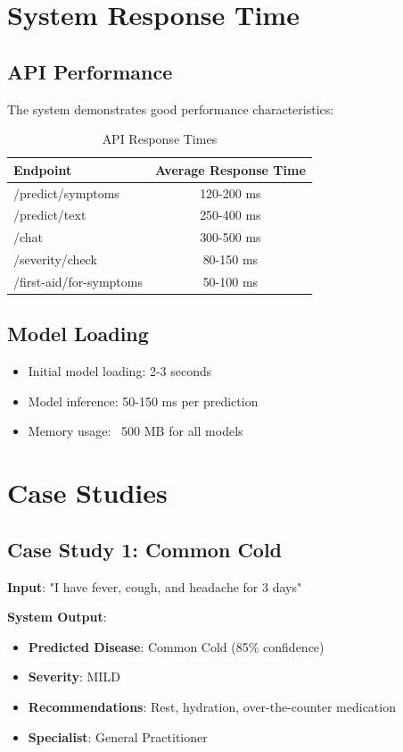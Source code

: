 \section{System Response Time}
\subsection{API Performance}
The system demonstrates good performance characteristics:

\begin{table}[H]
\centering
\caption{API Response Times}
\begin{tabular}{|l|c|}
\hline
\textbf{Endpoint} & \textbf{Average Response Time} \\
\hline
/predict/symptoms & 120-200 ms \\
\hline
/predict/text & 250-400 ms \\
\hline
/chat & 300-500 ms \\
\hline
/severity/check & 80-150 ms \\
\hline
/first-aid/for-symptoms & 50-100 ms \\
\hline
\end{tabular}
\end{table}

\subsection{Model Loading}
\begin{itemize}
    \item Initial model loading: 2-3 seconds
    \item Model inference: 50-150 ms per prediction
    \item Memory usage: ~500 MB for all models
\end{itemize}

\section{Case Studies}
\subsection{Case Study 1: Common Cold}
\textbf{Input}: "I have fever, cough, and headache for 3 days"

\textbf{System Output}:
\begin{itemize}
    \item \textbf{Predicted Disease}: Common Cold (85\% confidence)
    \item \textbf{Severity}: MILD
    \item \textbf{Recommendations}: Rest, hydration, over-the-counter medication
    \item \textbf{Specialist}: General Practitioner
\end{itemize}

